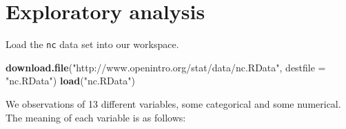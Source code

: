 \documentclass[]{book}
\newenvironment{Shaded}{\begin{snugshade}}{\end{snugshade}}
\newcommand{\DataTypeTok}[1]{\textcolor[rgb]{0.13,0.29,0.53}{#1}}
\newcommand{\KeywordTok}[1]{\textcolor[rgb]{0.13,0.29,0.53}{\textbf{#1}}}
\newcommand{\NormalTok}[1]{#1}
\newcommand{\StringTok}[1]{\textcolor[rgb]{0.31,0.60,0.02}{#1}}
\theoremstyle{definition}
\theoremstyle{definition}
\theoremstyle{definition}
\theoremstyle{remark}
\begin{document}
\hypertarget{exploratory-analysis}{%
\section{Exploratory analysis}\label{exploratory-analysis}}

Load the \texttt{nc} data set into our workspace.

\begin{Shaded}
\begin{Highlighting}[]
\KeywordTok{download.file}\NormalTok{(}\StringTok{"http://www.openintro.org/stat/data/nc.RData"}\NormalTok{, }\DataTypeTok{destfile =} \StringTok{"nc.RData"}\NormalTok{)}
\KeywordTok{load}\NormalTok{(}\StringTok{"nc.RData"}\NormalTok{)}
\end{Highlighting}
\end{Shaded}

We observations of 13 different variables, some categorical and some
numerical. The meaning of each variable is as follows:
\end{document}
